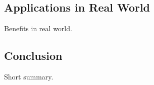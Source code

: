 \documentclass{article}
\begin{document}
\subsection{Applications in Real World}
Benefits in real world.

\subsection{Conclusion}
Short summary.









\cite{kaluzny2022scouting}

\cite{mordu2016managing}

\cite{nusari2018impact}
\cite{rasnacis2017method}
\cite{gomes2016improving}
\cite{burgueslimitations}
\cite{sage2014critical}
\end{document}
